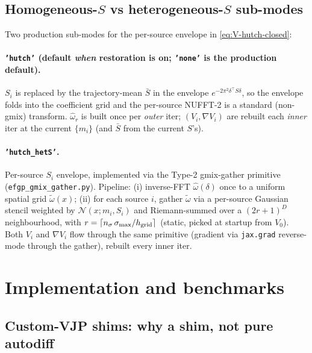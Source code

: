\documentclass[11pt]{article}
\newcommand{\code}[1]{\texttt{\small #1}}
\begin{document}
\subsection{Homogeneous-$S$ vs heterogeneous-$S$ sub-modes}

Two production sub-modes for the per-source envelope in
\eqref{eq:V-hutch-closed}:

\paragraph{\code{'hutch'} (default \emph{when} restoration is on;
\code{'none'} is the production default).}
$S_i$ is replaced by the trajectory-mean $\bar S$ in the envelope
$e^{-2\pi^2 \delta^\top S \delta}$, so the envelope folds into the
coefficient grid and the per-source NUFFT-2 is a standard (non-gmix)
transform. $\hat\omega_r$ is built once per \emph{outer} iter;
$(V_i, \nabla V_i)$ are rebuilt each \emph{inner} iter at the current
$\{m_i\}$ (and $\bar S$ from the current $S$'s).

\paragraph{\code{'hutch\_hetS'}.}
Per-source $S_i$ envelope, implemented via the Type-2 gmix-gather
primitive (\code{efgp\_gmix\_gather.py}). Pipeline: (i) inverse-FFT
$\hat\omega(\delta)$ once to a uniform spatial grid
$\widetilde\omega(x)$; (ii) for each source $i$, gather $\widetilde\omega$
via a per-source Gaussian stencil weighted by $\mathcal{N}(x; m_i, S_i)$
and Riemann-summed over a $(2r{+}1)^D$ neighbourhood, with
$r = \lceil n_\sigma\,\sigma_{\max}/h_{\rm grid}\rceil$ (static, picked at
startup from $V_0$). Both $V_i$ and $\nabla V_i$ flow through the same
primitive (gradient via \code{jax.grad} reverse-mode through the gather),
rebuilt every inner iter.

\section{Implementation and benchmarks}
\label{app:impl}

\subsection{Custom-VJP shims: why a shim, not pure autodiff}
\end{document}

